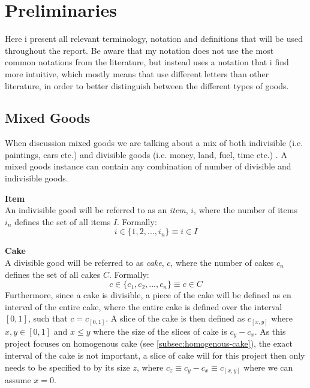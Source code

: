 \section{Preliminaries}\label{sec:preliminaries}

Here i present all relevant terminology, notation and definitions that will be used throughout the report. Be aware that my notation does not use the most common notations from the literature, but instead uses a notation that i find more intuitive, which mostly means that use different letters than other literature, in order to better distinguish between the different types of goods.

\def\sGood{g}
\def\sAllGoods{G}
\def\sNumGoods{m}

\def\sItem{i}
\def\sAllItems{I}
\def\sNumItems{i_n}

\def\sCake{c}
\def\sTheCake{C}
\def\sAllCakes{C}
\def\sNumCakes{c_n}

\def\sAgent{a}
\def\sAllAgents{A}
\def\sNumAgents{n}

\def\sValuation{v}
\def\sAllValuations{V}
\def\sNumValuations{v_n}

\def\sAllocation{\scalebox{1.25}{$\mathpzc{A}$}}
\def\sInstance{\scalebox{1.1}{I}}
\def\sBundle{B}

\def\MMS{\text{MMS}}
\def\halfMMS{\frac{1}{2}\text{MMS}}
\def\PROP{\text{PROP}}
\def\R{\mathbb{R}}


\subsection*{Mixed Goods}
When discussion mixed goods we are talking about a mix of both indivisible (i.e. paintings, cars etc.) and divisible goods (i.e. money, land, fuel, time etc.) . A mixed goods instance can contain any combination of number of divisible and indivisible goods.

\textbf{Item}\\
An indivisible good will be referred to as an \emph{item}, $\sItem$, where the number of items $\sNumItems$ defines the set of all items $\sAllItems$. Formally:
$$\sItem\in\{1,2,...,\sNumItems\}\equiv\sItem\in\sAllItems$$

\textbf{Cake}\\
A divisible good will be referred to as \emph{cake}, $\sCake$, where the number of cakes $\sNumCakes$ defines the set of all cakes $\sAllCakes$. Formally:
$$\sCake\in\{\sCake_1, \sCake_2, ...,\sNumCakes\}\equiv\sCake\in\sAllCakes$$
Furthermore, since a cake is divisible, a piece of the cake will be defined as en interval of the entire cake, where the entire cake is defined over the interval $[0,1]$, such that $\sCake=\sCake_{[0,1]}$.
A slice of the cake is then defined as $\sCake_{[x,y]}$ where $x,y \in [0,1]$ and $x \leq y$ where the size of the slices of cake is $\sCake_y-\sCake_x$. As this project focuses on homogenous cake (see \autoref{subsec:homogenous-cake}), the exact interval of the cake is not important, a slice of cake will for this project then only needs to be specified to by its size $z$, where $\sCake_z\equiv\sCake_y-\sCake_x\equiv\sCake_{[x,y]}$ where we can assume $x=0$.

